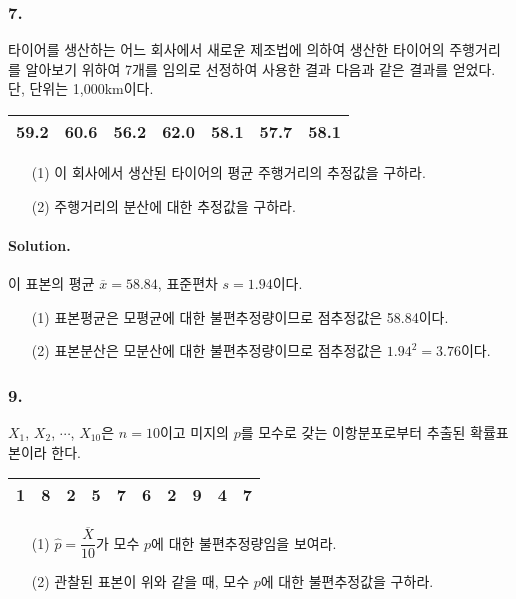 \subsubsection{7.} 타이어를 생산하는 어느 회사에서 새로운 제조법에 의하여 생산한 타이어의 주행거리를 알아보기 위하여 7개를 임의로
선정하여 사용한 결과 다음과 같은 결과를 얻었다. 단, 단위는 1,000km이다.

\begin{center}
    \begin{tabular}{ccccccc}
        \hline
        59.2&60.6&56.2&62.0&58.1&57.7&58.1\\
        \hline
    \end{tabular}
\end{center}

\begin{itemize}
    \item[(1)] 이 회사에서 생산된 타이어의 평균 주행거리의 추정값을 구하라.
    \item[(2)] 주행거리의 분산에 대한 추정값을 구하라. 
\end{itemize}

\paragraph{Solution.} 이 표본의 평균 $\overline{x}=58.84$, 표준편차 $s=1.94$이다.
\begin{itemize}
    \item[(1)] {
        표본평균은 모평균에 대한 불편추정량이므로 점추정값은 58.84이다.
    }
    \item[(2)] {
        표본분산은 모분산에 대한 불편추정량이므로 점추정값은 $1.94^2=3.76$이다.
    }
\end{itemize}

\subsubsection{9.} $X_1$, $X_2$, $\cdots$, $X_{10}$은 $n=10$이고 미지의 $p$를 모수로 갖는 이항분포로부터 추출된 확률표본이라 한다.

\begin{center}
    \begin{tabular}{cccccccccc}
        \hline
        1&8&2&5&7&6&2&9&4&7\\
        \hline
    \end{tabular}
\end{center}

\begin{itemize}
    \item[(1)] $\hat{p}=\dfrac{\overline{X}}{10}$가 모수 $p$에 대한 불편추정량임을 보여라.
    \item[(2)] 관찰된 표본이 위와 같을 때, 모수 $p$에 대한 불편추정값을 구하라. 
\end{itemize}

